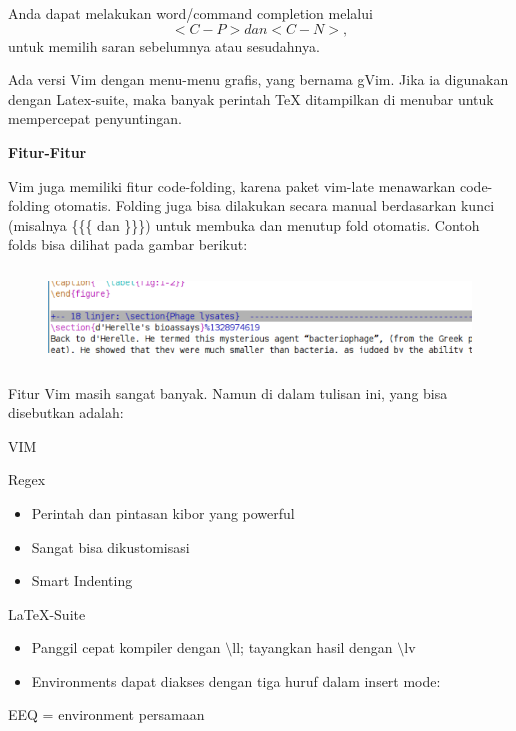 \begin{enumerate}
Anda dapat melakukan word/command completion melalui 
\begin{equation}
<C-P> dan <C-N>, 
\end{equation}untuk memilih saran sebelumnya atau sesudahnya.

Ada versi Vim dengan menu-menu grafis, yang bernama gVim. Jika ia digunakan dengan Latex-suite, maka banyak perintah TeX ditampilkan di menubar untuk mempercepat penyuntingan.
\par \vspace{12pt}
\textbf{Fitur-Fitur}
\par \vspace{12pt}
Vim juga memiliki fitur code-folding, karena paket vim-late menawarkan code-folding otomatis. Folding juga bisa dilakukan secara manual berdasarkan kunci (misalnya \{\{\{ dan \}\}\}) untuk membuka dan menutup fold otomatis. Contoh folds bisa dilihat pada gambar berikut:

\begin{figure}[ht]

\includegraphics[width=15.12cm,height=2.54cm]{gambar/image5.jpg}
\end{figure}

Fitur Vim masih sangat banyak. Namun di dalam tulisan ini, yang bisa disebutkan adalah:

VIM

Regex

\begin{itemize}
\item Perintah dan pintasan kibor yang powerful
\item Sangat bisa dikustomisasi
\item Smart Indenting
\end{itemize}
LaTeX-Suite

\begin{itemize}
\item Panggil cepat kompiler dengan $\setminus$ll; tayangkan hasil dengan $\setminus$lv
\item Environments dapat diakses dengan tiga huruf dalam insert mode:
\end{itemize}
\hspace{0,2in}EEQ = environment persamaan


\end{enumerate}
